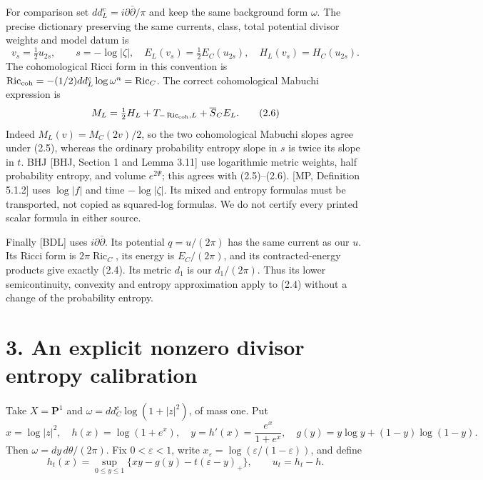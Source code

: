 \documentclass[
  11pt,
]{article}
\begin{document}
For comparison set \(dd^c_L=i\partial\bar\partial/\pi\) and keep the
same background form \(\omega\). The precise dictionary preserving the
same currents, class, total potential divisor weights and model datum is
\[
 v_s=\tfrac12u_{2s},\qquad s=-\log|\zeta|,
 \quad E_L(v_s)=\tfrac12E_C(u_{2s}),
 \quad H_L(v_s)=H_C(u_{2s}).                                \tag{2.5}
\] The cohomological Ricci form in this convention is
\(\operatorname{Ric}_{\rm coh}=-(1/2)dd^c_L\log\omega^n=\operatorname{Ric}_C\).
The correct cohomological Mabuchi expression is \[
 M_L=\tfrac12 H_L+T_{-\operatorname{Ric}_{\rm coh},L}
                      +\overline S_C E_L.
                                                               \tag{2.6}
\] Indeed \(M_L(v)=M_C(2v)/2\), so the two cohomological Mabuchi slopes
agree under (2.5), whereas the ordinary probability entropy slope in
\(s\) is twice its slope in \(t\). BHJ {[}BHJ, Section 1 and Lemma
3.11{]} use logarithmic metric weights, half probability entropy, and
volume \(e^{2\Psi}\); this agrees with (2.5)--(2.6). {[}MP, Definition
5.1.2{]} uses \(\log|f|\) and time \(-\log|\zeta|\). Its mixed and
entropy formulas must be transported, not copied as squared-log
formulas. We do not certify every printed scalar formula in either
source.

Finally {[}BDL{]} uses \(i\partial\bar\partial\). Its potential
\(q=u/(2\pi)\) has the same current as our \(u\). Its Ricci form is
\(2\pi\operatorname{Ric}_C\), its energy is \(E_C/(2\pi)\), and its
contracted-energy products give exactly (2.4). Its metric \(d_1\) is our
\(d_1/(2\pi)\). Thus its lower semicontinuity, convexity and entropy
approximation apply to (2.4) without a change of the probability
entropy.

\section{3. An explicit nonzero divisor entropy
calibration}\label{an-explicit-nonzero-divisor-entropy-calibration}

Take \(X=\mathbf P^1\) and \(\omega=dd^c_C\log(1+|z|^2)\), of mass one.
Put \[
 x=\log|z|^2,\quad h(x)=\log(1+e^x),\quad
 y=h'(x)=\frac{e^x}{1+e^x},\quad
 g(y)=y\log y+(1-y)\log(1-y).
\] Then \(\omega=dy\,d\theta/(2\pi)\). Fix \(0<\varepsilon<1\), write
\(x_\varepsilon=\log(\varepsilon/(1-\varepsilon))\), and define \[
 h_t(x)=\sup_{0\leq y\leq1}\{xy-g(y)-t(\varepsilon-y)_+\},
 \qquad u_t=h_t-h.                                        \tag{3.1}
\]
\end{document}
